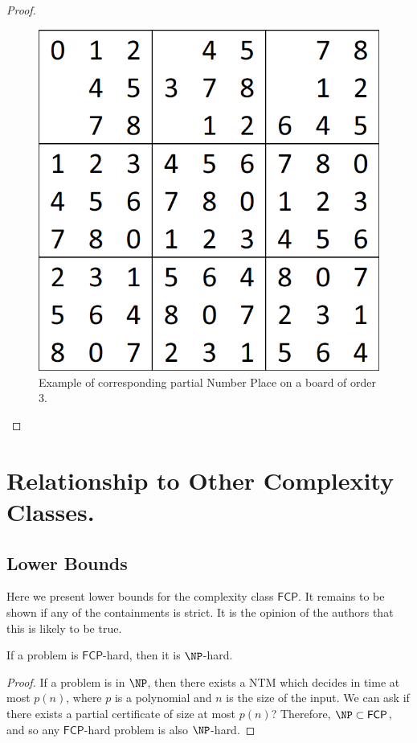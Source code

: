 \documentclass[runningheads,a4paper]{llncs}
\begin{document}
\begin{proof}
\begin{figure}[H]
\label{fig:partialNP}
\centering
\includegraphics[scale=0.25]{sudoku-1.png}
\caption{Example of corresponding partial Number Place on a board of order 3.}
\end{figure}

\end{proof}

\section{Relationship to Other Complexity Classes.}
\label{sec:relationship}

\subsection{Lower Bounds}

Here we present lower bounds for the complexity class $\mathsf{FCP}$. It remains to be shown if any of the containments is strict. It is the opinion of the authors that this is likely to be true. 

\begin{proposition}
If a problem is $\mathsf{FCP}$-hard, then it is $\NP$-hard.
\end{proposition}

\begin{proof}
If a problem is in $\NP$, then there exists a NTM which decides in time at most $p(n)$, where $p$ is a polynomial and $n$ is the size of the input. We can ask if there exists a partial certificate of size at most $p(n)$? Therefore, $\NP \subset \mathsf{FCP}$, and so any $\mathsf{FCP}$-hard problem is also $\NP$-hard. 
\end{proof}
\end{document}
